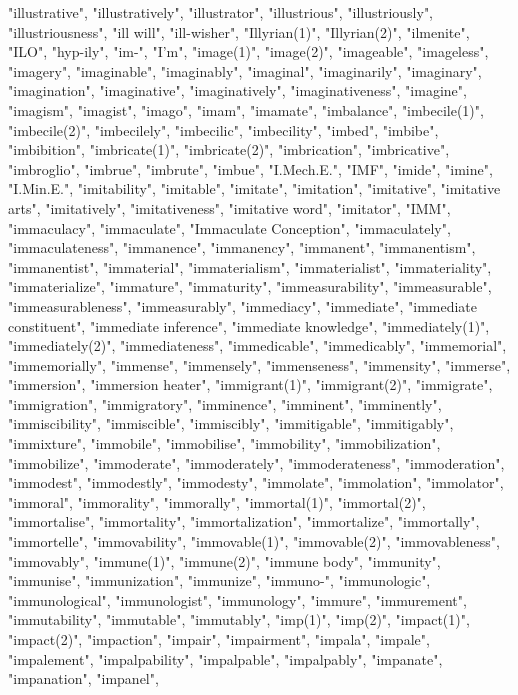 "illustrative",
"illustratively",
"illustrator",
"illustrious",
"illustriously",
"illustriousness",
"ill will",
"ill-wisher",
"Illyrian(1)",
"Illyrian(2)",
"ilmenite",
"ILO",
"hyp-ily",
"im-",
"I'm",
"image(1)",
"image(2)",
"imageable",
"imageless",
"imagery",
"imaginable",
"imaginably",
"imaginal",
"imaginarily",
"imaginary",
"imagination",
"imaginative",
"imaginatively",
"imaginativeness",
"imagine",
"imagism",
"imagist",
"imago",
"imam",
"imamate",
"imbalance",
"imbecile(1)",
"imbecile(2)",
"imbecilely",
"imbecilic",
"imbecility",
"imbed",
"imbibe",
"imbibition",
"imbricate(1)",
"imbricate(2)",
"imbrication",
"imbricative",
"imbroglio",
"imbrue",
"imbrute",
"imbue",
"I.Mech.E.",
"IMF",
"imide",
"imine",
"I.Min.E.",
"imitability",
"imitable",
"imitate",
"imitation",
"imitative",
"imitative arts",
"imitatively",
"imitativeness",
"imitative word",
"imitator",
"IMM",
"immaculacy",
"immaculate",
"Immaculate Conception",
"immaculately",
"immaculateness",
"immanence",
"immanency",
"immanent",
"immanentism",
"immanentist",
"immaterial",
"immaterialism",
"immaterialist",
"immateriality",
"immaterialize",
"immature",
"immaturity",
"immeasurability",
"immeasurable",
"immeasurableness",
"immeasurably",
"immediacy",
"immediate",
"immediate constituent",
"immediate inference",
"immediate knowledge",
"immediately(1)",
"immediately(2)",
"immediateness",
"immedicable",
"immedicably",
"immemorial",
"immemorially",
"immense",
"immensely",
"immenseness",
"immensity",
"immerse",
"immersion",
"immersion heater",
"immigrant(1)",
"immigrant(2)",
"immigrate",
"immigration",
"immigratory",
"imminence",
"imminent",
"imminently",
"immiscibility",
"immiscible",
"immiscibly",
"immitigable",
"immitigably",
"immixture",
"immobile",
"immobilise",
"immobility",
"immobilization",
"immobilize",
"immoderate",
"immoderately",
"immoderateness",
"immoderation",
"immodest",
"immodestly",
"immodesty",
"immolate",
"immolation",
"immolator",
"immoral",
"immorality",
"immorally",
"immortal(1)",
"immortal(2)",
"immortalise",
"immortality",
"immortalization",
"immortalize",
"immortally",
"immortelle",
"immovability",
"immovable(1)",
"immovable(2)",
"immovableness",
"immovably",
"immune(1)",
"immune(2)",
"immune body",
"immunity",
"immunise",
"immunization",
"immunize",
"immuno-",
"immunologic",
"immunological",
"immunologist",
"immunology",
"immure",
"immurement",
"immutability",
"immutable",
"immutably",
"imp(1)",
"imp(2)",
"impact(1)",
"impact(2)",
"impaction",
"impair",
"impairment",
"impala",
"impale",
"impalement",
"impalpability",
"impalpable",
"impalpably",
"impanate",
"impanation",
"impanel",
